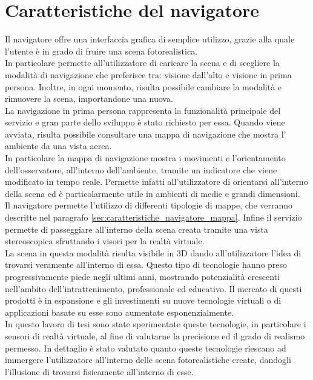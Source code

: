 \section{Caratteristiche del navigatore}
\label{sec:chapter_navigazione_scena_caratt_navigat}

Il navigatore offre una interfaccia grafica di semplice utilizzo, grazie alla quale l’utente è in grado di fruire una scena fotorealistica.
\\
In particolare permette all’utilizzatore di caricare la scena e di scegliere la modalità di navigazione che preferisce tra: visione dall’alto e visione in prima persona. 
Inoltre, in ogni momento, risulta possibile cambiare la modalità e rimuovere la scena, importandone una nuova.
\\
La navigazione in prima persona rappresenta la funzionalità principale del servizio e gran parte dello sviluppo è stato richiesto per essa.
Quando viene avviata, risulta possibile consultare una mappa di navigazione che mostra l’ ambiente da una vista aerea.
\\
In particolare la mappa di navigazione mostra i movimenti e l’orientamento dell’osservatore, all’interno dell’ambiente, tramite un indicatore che viene modificato in tempo reale. 
Permette infatti all’utilizzatore di orientarsi all’interno della scena ed è particolarmente utile in ambienti di medie e grandi dimensioni.
\\
Il navigatore permette l’utilizzo di differenti tipologie di mappe, che verranno descritte nel paragrafo \ref{sec:caratteristiche_navigatore_mappa}.
Infine il servizio permette di passeggiare all’interno della scena creata tramite una vista stereoscopica sfruttando i visori per la realtà virtuale. 
\\
La scena in questa modalità risulta visibile in 3D dando all’utilizzatore l’idea di trovarsi veramente all’interno di essa.
Questo tipo di tecnologie hanno preso progressivamente piede negli ultimi anni, mostrando potenzialità crescenti nell’ambito dell’intrattenimento, professionale ed educativo.
Il mercato di questi prodotti è in espansione e gli investimenti su nuove tecnologie virtuali o di applicazioni basate su esse sono aumentate esponenzialmente. 
\\
In questo lavoro di tesi sono state sperimentate queste tecnologie, in particolare i sensori di realtà virtuale, al fine di valutarne la precisione ed il grado di realismo permesso. 
In dettaglio è stato valutato quanto queste tecnologie riescano ad immergere l’utilizzatore all’interno delle scena fotorealistiche create, dandogli l’illusione di trovarsi fisicamente all’interno di esse.

